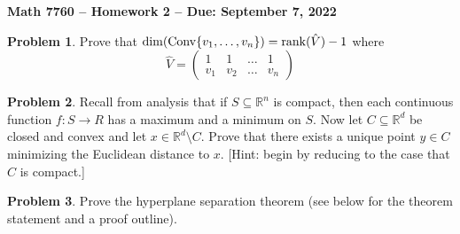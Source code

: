 \documentclass[letterpaper,11pt]{amsart}
\theoremstyle{plain}
\theoremstyle{definition}
\newtheorem{pr}{Problem}
\theoremstyle{remark}
\newcommand{\conv}{{\rm Conv}}
\newcommand{\rank}{{\rm rank}}
\begin{document}
\Large

\begin{center}
{\bf Math 7760 -- Homework  2 --  Due:  September 7, 2022}
\end{center}

\normalsize


\bigskip


\bigskip

\begin{pr}
    Prove that $\dim(\conv\{v_1,\dots,v_n\}) = \rank(\hat{V}) - 1$ where
    \[
        \hat{V} = \begin{pmatrix}
            1 & 1 & \dots & 1 \\
            v_1 & v_2 & \dots & v_n
        \end{pmatrix}
    \]
\end{pr}

\begin{pr}\label{convexNearest}
    Recall from analysis that if $S \subseteq \mathbb{R}^n$ is compact, then each continuous function $f: S \rightarrow R$
    has a maximum and a minimum on $S$.
    Now let $C\subseteq \mathbb{R}^d$ be closed and convex and let $x \in \mathbb{R}^d \setminus C$.
    Prove that there exists a unique point $y \in C$ minimizing the Euclidean distance to $x$.
    [Hint: begin by reducing to the case that $C$ is compact.]
\end{pr}

\bigskip


\bigskip

\begin{pr}
    Prove the hyperplane separation theorem (see below for the theorem statement and a proof outline).
\end{pr}
\end{document}

